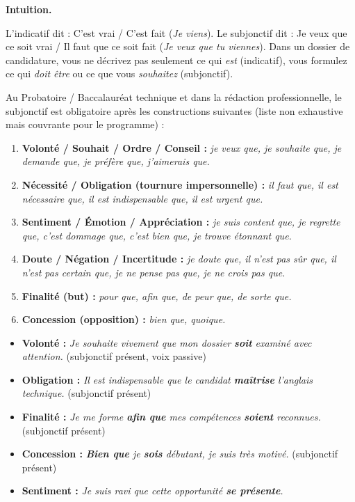 \documentclass[11pt]{article}
\begin{document}
\textbf{Intuition.}\par
L'indicatif dit : \og C'est vrai / C'est fait \fg{} (\emph{Je viens}). Le subjonctif dit : \og Je veux que ce soit vrai / Il faut que ce soit fait \fg{} (\emph{Je veux que tu viennes}). Dans un dossier de candidature, vous ne décrivez pas seulement ce qui \emph{est} (indicatif), vous formulez ce qui \emph{doit être} ou ce que vous \emph{souhaitez} (subjonctif).

\begin{methode}
Au Probatoire / Baccalauréat technique et dans la rédaction professionnelle, le subjonctif est obligatoire après les constructions suivantes (liste non exhaustive mais couvrante pour le programme) :
\begin{enumerate}
    \item \textbf{Volonté / Souhait / Ordre / Conseil :} \emph{je veux que, je souhaite que, je demande que, je préfère que, j'aimerais que.}
    \item \textbf{Nécessité / Obligation (tournure impersonnelle) :} \emph{il faut que, il est nécessaire que, il est indispensable que, il est urgent que.}
    \item \textbf{Sentiment / Émotion / Appréciation :} \emph{je suis content que, je regrette que, c'est dommage que, c'est bien que, je trouve étonnant que.}
    \item \textbf{Doute / Négation / Incertitude :} \emph{je doute que, il n'est pas sûr que, il n'est pas certain que, je ne pense pas que, je ne crois pas que.}
    \item \textbf{Finalité (but) :} \emph{pour que, afin que, de peur que, de sorte que.}
    \item \textbf{Concession (opposition) :} \emph{bien que, quoique.}
\end{enumerate}
\end{methode}

\begin{exemplebox}
\begin{itemize}
    \item \textbf{Volonté :} \og \emph{Je souhaite vivement que mon dossier \textbf{soit} examiné avec attention.} \fg{} (subjonctif présent, voix passive)
    \item \textbf{Obligation :} \og \emph{Il est indispensable que le candidat \textbf{maîtrise} l'anglais technique.} \fg{} (subjonctif présent)
    \item \textbf{Finalité :} \og \emph{Je me forme \textbf{afin que} mes compétences \textbf{soient} reconnues.} \fg{} (subjonctif présent)
    \item \textbf{Concession :} \og \emph{\textbf{Bien que} je \textbf{sois} débutant, je suis très motivé.} \fg{} (subjonctif présent)
    \item \textbf{Sentiment :} \og \emph{Je suis ravi que cette opportunité \textbf{se présente}.} \fg{}
\end{itemize}
\end{exemplebox}
\end{document}

